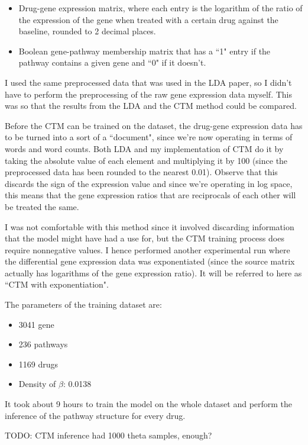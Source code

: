\documentclass[12pt,a4paper,twoside,openright]{report}
\begin{document}
\begin{itemize}[noitemsep]
\item Drug-gene expression matrix, where each entry is the logarithm of the ratio of the expression of the gene when treated with a certain drug against the baseline, rounded to 2 decimal places.
\item Boolean gene-pathway membership matrix that has a ``1" entry if the pathway contains a given gene and ``0" if it doesn't.
\end{itemize}

I used the same preprocessed data that was used in the LDA paper, so I didn't have to perform the preprocessing of the raw gene expression data myself. This was so that the results from the LDA and the CTM method could be compared.

Before the CTM can be trained on the dataset, the drug-gene expression data has to be turned into a sort of a ``document", since we're now operating in terms of words and word counts. Both LDA and my implementation of CTM do it by taking the absolute value of each element and multiplying it by 100 (since the preprocessed data has been rounded to the nearest 0.01). Observe that this discards the sign of the expression value and since we're operating in log space, this means that the gene expression ratios that are reciprocals of each other will be treated the same.

I was not comfortable with this method since it involved discarding information that the model might have had a use for, but the CTM training process does require nonnegative values. I hence performed another experimental run where the differential gene expression data was exponentiated (since the source matrix actually has logarithms of the gene expression ratio). It will be referred to here as ``CTM with exponentiation".

The parameters of the training dataset are:
\begin{itemize}[noitemsep]
\item 3041 gene
\item 236 pathways
\item 1169 drugs
\item Density of $\beta$: 0.0138
\end{itemize}

It took about 9 hours to train the model on the whole dataset and perform the inference of the pathway structure for every drug.

TODO: CTM inference had 1000 theta samples, enough?
\end{document}

